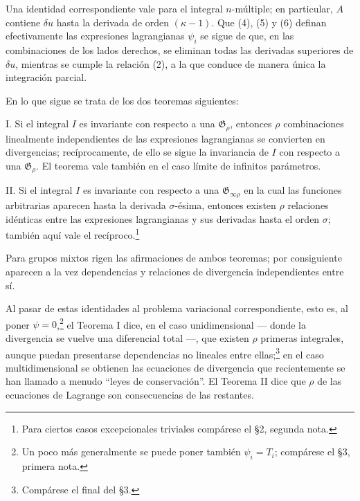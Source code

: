 \documentclass[11pt]{article}
\providecommand{\G}{\mathfrak G}
\begin{document}
Una identidad correspondiente vale para el integral \(n\)-múltiple; en particular, \(A\) contiene \(\delta u\) hasta la derivada de orden \((\kappa-1)\). Que (4), (5) y (6) definan efectivamente las expresiones lagrangianas \(\psi_i\) se sigue de que, en las combinaciones de los lados derechos, se eliminan todas las derivadas superiores de \(\delta u\), mientras se cumple la relación (2), a la que conduce de manera única la integración parcial.

En lo que sigue se trata de los dos teoremas siguientes:

I. Si el integral \(I\) es invariante con respecto a una \(\G_\rho\), entonces \(\rho\) combinaciones linealmente independientes de las expresiones lagrangianas se convierten en divergencias; recíprocamente, de ello se sigue la invariancia de \(I\) con respecto a una \(\G_\rho\). El teorema vale también en el caso límite de infinitos parámetros.

II. Si el integral \(I\) es invariante con respecto a una \(\G_{\infty\rho}\) en la cual las funciones arbitrarias aparecen hasta la derivada \(\sigma\)-ésima, entonces existen \(\rho\) relaciones idénticas entre las expresiones lagrangianas y sus derivadas hasta el orden \(\sigma\); también aquí vale el recíproco.\footnote{Para ciertos casos excepcionales triviales compárese el \S{}2, segunda nota.}

Para grupos mixtos rigen las afirmaciones de ambos teoremas; por consiguiente aparecen a la vez dependencias y relaciones de divergencia independientes entre sí.

Al pasar de estas identidades al problema variacional correspondiente, esto es, al poner \(\psi=0\),\footnote{Un poco más generalmente se puede poner también \(\psi_i=T_i\); compárese el \S{}3, primera nota.} el Teorema I dice, en el caso unidimensional --- donde la divergencia se vuelve una diferencial total ---, que existen \(\rho\) primeras integrales, aunque puedan presentarse dependencias no lineales entre ellas;\footnote{Compárese el final del \S{}3.} en el caso multidimensional se obtienen las ecuaciones de divergencia que recientemente se han llamado a menudo ``leyes de conservación''. El Teorema II dice que \(\rho\) de las ecuaciones de Lagrange son consecuencias de las restantes.
\end{document}
